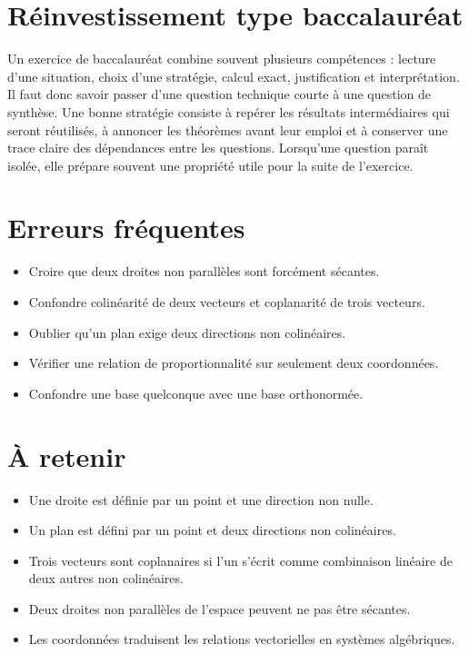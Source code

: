 \section{Réinvestissement type baccalauréat}
Un exercice de baccalauréat combine souvent plusieurs compétences : lecture d'une situation, choix d'une stratégie, calcul exact, justification et interprétation. Il faut donc savoir passer d'une question technique courte à une question de synthèse. Une bonne stratégie consiste à repérer les résultats intermédiaires qui seront réutilisés, à annoncer les théorèmes avant leur emploi et à conserver une trace claire des dépendances entre les questions. Lorsqu'une question paraît isolée, elle prépare souvent une propriété utile pour la suite de l'exercice.

\section{Erreurs fréquentes}
\begin{itemize}
\item Croire que deux droites non parallèles sont forcément sécantes.
\item Confondre colinéarité de deux vecteurs et coplanarité de trois vecteurs.
\item Oublier qu’un plan exige deux directions non colinéaires.
\item Vérifier une relation de proportionnalité sur seulement deux coordonnées.
\item Confondre une base quelconque avec une base orthonormée.
\end{itemize}

\section{À retenir}
\begin{aretenir}
\begin{itemize}
\item Une droite est définie par un point et une direction non nulle.
\item Un plan est défini par un point et deux directions non colinéaires.
\item Trois vecteurs sont coplanaires si l’un s’écrit comme combinaison linéaire de deux autres non colinéaires.
\item Deux droites non parallèles de l’espace peuvent ne pas être sécantes.
\item Les coordonnées traduisent les relations vectorielles en systèmes algébriques.
\end{itemize}
\end{aretenir}
